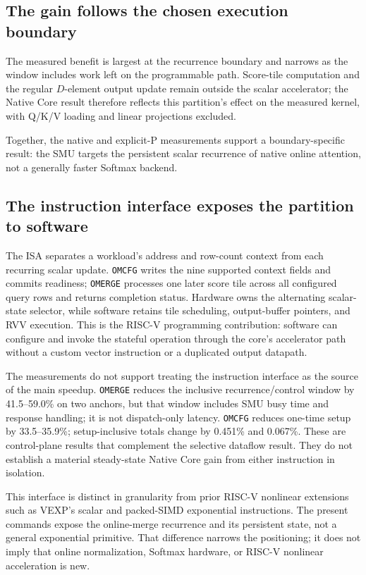 \documentclass[journal]{IEEEtran}
\begin{document}
\subsection{The gain follows the chosen execution boundary}
The measured benefit is largest at the recurrence boundary and narrows as the
window includes work left on the programmable path. Score-tile computation and
the regular $D$-element output update remain outside the scalar accelerator;
the Native Core result therefore reflects this partition's effect on the
measured kernel, with Q/K/V loading and linear projections excluded.

Together, the native and explicit-P measurements support a boundary-specific
result: the SMU targets the persistent scalar recurrence of native online
attention, not a generally faster Softmax backend.

\subsection{The instruction interface exposes the partition to software}
The ISA separates a workload's address and row-count context from each
recurring scalar update. \texttt{OMCFG} writes the nine supported context
fields and commits readiness; \texttt{OMERGE} processes one later score tile
across all configured query rows and returns completion status. Hardware owns the alternating scalar-state
selector, while software retains tile scheduling, output-buffer pointers, and
RVV execution. This is the RISC-V programming contribution: software can
configure and invoke the stateful operation through the core's accelerator
path without a custom vector instruction or a duplicated output datapath.

The measurements do not support treating the instruction interface as the
source of the main speedup. \texttt{OMERGE} reduces the inclusive
recurrence/control window by 41.5--59.0\% on two anchors, but that window
includes SMU busy time and response handling; it is not dispatch-only latency.
\texttt{OMCFG} reduces one-time setup by 33.5--35.9\%; setup-inclusive
totals change by 0.451\% and 0.067\%.
These are control-plane results that complement the selective dataflow result.
They do not establish a material steady-state Native Core gain from either
instruction in isolation.

This interface is distinct in granularity from prior RISC-V nonlinear
extensions such as VEXP's scalar and packed-SIMD exponential instructions. The
present commands expose the online-merge recurrence and its persistent state,
not a general exponential primitive. That difference narrows the positioning;
it does not imply that online normalization, Softmax hardware, or RISC-V
nonlinear acceleration is new.
\end{document}
